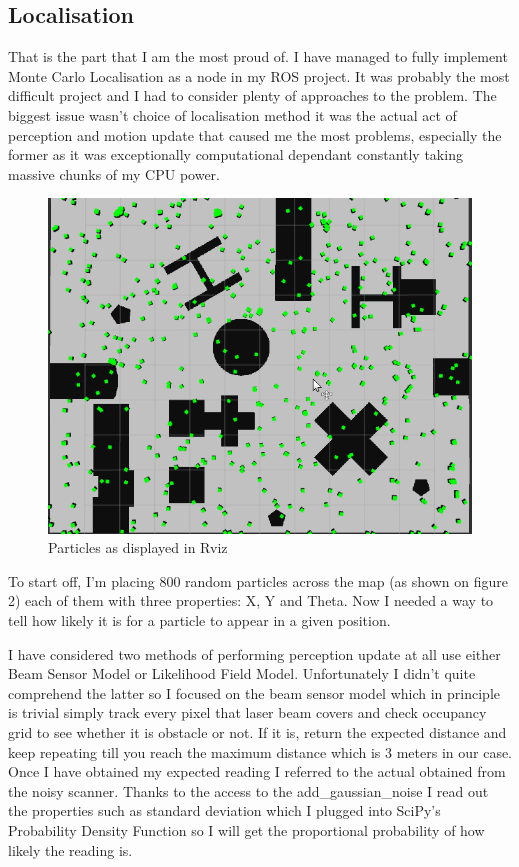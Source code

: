\documentclass[a4paper]{article}
\begin{document}
\subsection{Localisation}
That is the part that I am the most proud of. I have managed to fully implement Monte Carlo Localisation as a node in my ROS project. It was probably the most difficult project and I had to consider plenty of approaches to the problem. The biggest issue wasn't choice of localisation method \textendash{} it was the actual act of perception and motion update that caused me the most problems, especially the former as it was exceptionally computational dependant constantly taking massive chunks of my CPU power.
\begin{figure}[H]
    \centering
    \includegraphics[scale=0.3]{img2}
    \caption{Particles as displayed in Rviz}
\end{figure}
To start off, I'm placing 800 random particles across the map (as shown on figure 2) \textendash{} each of them with three properties: X, Y and Theta. Now I needed a way to tell how likely it is for a particle to appear in a given position.

I have considered two methods of performing perception update at all \textendash{} use either Beam Sensor Model or Likelihood Field Model. Unfortunately I didn't quite comprehend the latter so I focused on the beam sensor model which in principle is trivial \textendash{} simply track every pixel that laser beam covers and check occupancy grid to see whether it is obstacle or not. If it is, return the expected distance \textendash{} and keep repeating till you reach the maximum distance which is 3 meters in our case. Once I have obtained my expected reading I referred to the actual \textendash{} obtained from the noisy scanner. Thanks to the access to the add\_gaussian\_noise I read out the properties such as standard deviation which I plugged into SciPy's Probability Density Function so I will get the proportional probability of how likely the reading is.
\end{document}
